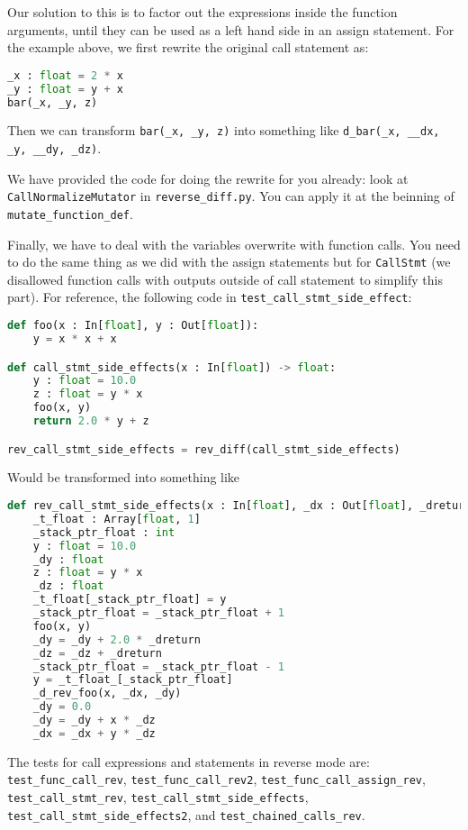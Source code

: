 Our solution to this is to factor out the expressions inside the function arguments, until they can be used as a left hand side in an assign statement. For the example above, we first rewrite the original call statement as:
\begin{lstlisting}[language=Python]
_x : float = 2 * x
_y : float = y + x
bar(_x, _y, z)
\end{lstlisting}
Then we can transform \lstinline{bar(_x, _y, z)} into something like \lstinline{d_bar(_x, __dx, _y, __dy, _dz)}.

We have provided the code for doing the rewrite for you already: look at \lstinline{CallNormalizeMutator} in \lstinline{reverse_diff.py}. You can apply it at the beinning of \lstinline{mutate_function_def}.

Finally, we have to deal with the variables overwrite with function calls. You need to do the same thing as we did with the assign statements but for \lstinline{CallStmt} (we disallowed function calls with outputs outside of call statement to simplify this part). For reference, the following code in \lstinline{test_call_stmt_side_effect}:
\begin{lstlisting}[language=Python]
def foo(x : In[float], y : Out[float]):
    y = x * x + x

def call_stmt_side_effects(x : In[float]) -> float:
    y : float = 10.0
    z : float = y * x
    foo(x, y)
    return 2.0 * y + z

rev_call_stmt_side_effects = rev_diff(call_stmt_side_effects)
\end{lstlisting}
Would be transformed into something like
\begin{lstlisting}[language=Python]
def rev_call_stmt_side_effects(x : In[float], _dx : Out[float], _dreturn : In[float]):
    _t_float : Array[float, 1]
    _stack_ptr_float : int
    y : float = 10.0
    _dy : float
    z : float = y * x
    _dz : float
    _t_float[_stack_ptr_float] = y
    _stack_ptr_float = _stack_ptr_float + 1
    foo(x, y)
    _dy = _dy + 2.0 * _dreturn
    _dz = _dz + _dreturn
    _stack_ptr_float = _stack_ptr_float - 1
    y = _t_float_[_stack_ptr_float]
    _d_rev_foo(x, _dx, _dy)
    _dy = 0.0
    _dy = _dy + x * _dz
    _dx = _dx + y * _dz
\end{lstlisting}

The tests for call expressions and statements in reverse mode are: \lstinline{test_func_call_rev}, \lstinline{test_func_call_rev2}, \lstinline{test_func_call_assign_rev}, \lstinline{test_call_stmt_rev}, \lstinline{test_call_stmt_side_effects}, \lstinline{test_call_stmt_side_effects2}, and \lstinline{test_chained_calls_rev}.

